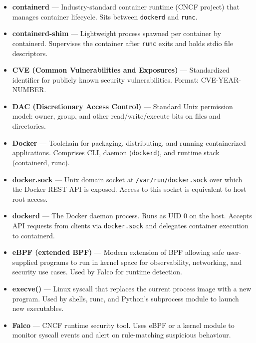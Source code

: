 \begin{itemize}
    \item \textbf{containerd} ---
    Industry-standard container runtime (CNCF project) that
    manages container lifecycle. Sits between \texttt{dockerd}
    and \texttt{runc}.

    \item \textbf{containerd-shim} ---
    Lightweight process spawned per container by containerd.
    Supervises the container after \texttt{runc} exits and holds
    stdio file descriptors.

    \item \textbf{CVE (Common Vulnerabilities and Exposures)} ---
    Standardized identifier for publicly known security
    vulnerabilities. Format: CVE-YEAR-NUMBER.

    \item \textbf{DAC (Discretionary Access Control)} ---
    Standard Unix permission model: owner, group, and other
    read/write/execute bits on files and directories.

    \item \textbf{Docker} ---
    Toolchain for packaging, distributing, and running
    containerized applications. Comprises CLI, daemon
    (\texttt{dockerd}), and runtime stack (containerd, runc).

    \item \textbf{docker.sock} ---
    Unix domain socket at \texttt{/var/run/docker.sock} over
    which the Docker REST API is exposed. Access to this socket
    is equivalent to host root access.

    \item \textbf{dockerd} ---
    The Docker daemon process. Runs as UID 0 on the host.
    Accepts API requests from clients via \texttt{docker.sock}
    and delegates container execution to containerd.

    \item \textbf{eBPF (extended BPF)} ---
    Modern extension of BPF allowing safe user-supplied programs
    to run in kernel space for observability, networking, and
    security use cases. Used by Falco for runtime detection.

    \item \textbf{execve()} ---
    Linux syscall that replaces the current process image with a
    new program. Used by shells, runc, and Python's subprocess
    module to launch new executables.

    \item \textbf{Falco} ---
    CNCF runtime security tool. Uses eBPF or a kernel module to
    monitor syscall events and alert on rule-matching suspicious
    behaviour.


\end{itemize}

